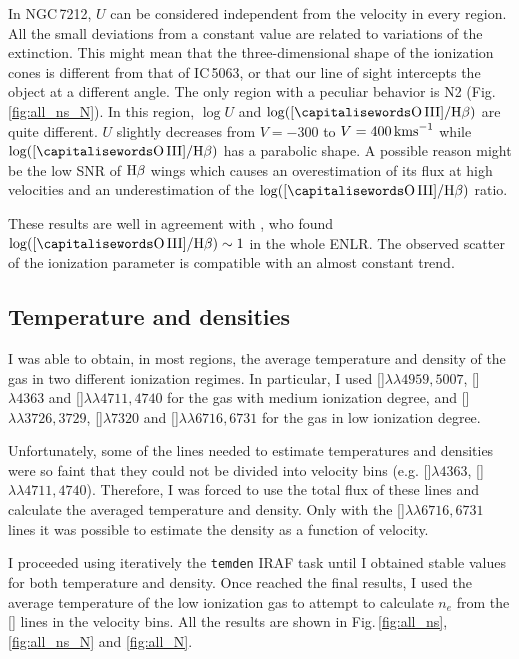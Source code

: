 \documentclass[../main.tex]{subfiles}
\begin{document}
In NGC\,7212, $U$ can be considered independent from the velocity in every region.
All the small deviations from a constant value are related to variations of the extinction.
This might mean that the three-dimensional shape of the ionization cones is different from that of IC\,5063, or that our line of sight intercepts the object at a different angle.
The only region with a peculiar behavior is N2 (Fig.\,\ref{fig:all_ns_N}).
In this region, $\log U$ and $\log([\rm\ion{O}{III}]/\Hb)$ are quite different.
$U$ slightly decreases from $V=-300$ to $V= 400\,\si{\kms}$ while $\log([\rm\ion{O}{III}]/\Hb)$ has a parabolic shape.
A possible reason might be the low SNR of $\Hb$ wings which causes an overestimation of its flux at high velocities and an underestimation of the $\log([\rm\ion{O}{III}]/\Hb)$ ratio.

These results are well in agreement with \citet{Cracco11}, who found $\log([\rm\ion{O}{III}]/\Hb)\sim1$ in the whole ENLR.
The observed scatter of the ionization parameter is compatible with an almost constant trend.



\subsection{Temperature and densities}

I was able to obtain, in most regions, the average temperature and density of the gas in two different ionization regimes.
In particular, I used []$\lambda\lambda4959,5007$, []$\lambda4363$ and  []$\lambda\lambda4711,4740$ for the gas with medium ionization degree, and []$\lambda\lambda3726,3729$, []$\lambda7320$ and  []$\lambda\lambda6716,6731$ for the gas in low ionization degree.

Unfortunately, some of the lines needed to estimate temperatures and densities were so faint that they could not be divided into velocity bins (e.g. []$\lambda4363$, []$\lambda\lambda4711,4740$).
Therefore, I was forced to use the total flux of these lines and calculate the averaged temperature and density.
Only with the []$\lambda\lambda6716,6731$ lines it was possible to estimate the density as a function of velocity. 

I proceeded using iteratively the \verb!temden! IRAF task until I obtained stable values for both temperature and density.
Once reached the final results, I used the average temperature of the low ionization gas to attempt to calculate $n_e$ from the [] lines in the velocity bins.
All the results are shown in Fig.\,\ref{fig:all_ns}, \ref{fig:all_ns_N} and \ref{fig:all_N}.
\end{document}
